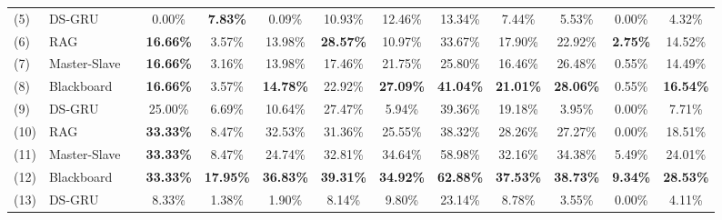 \begin{table}
{\begin{tabular}{ll c cccccc c c c c}
        \midrule
        \midrule
        
        (5) & {DS-GRU} &  & 0.00\% & \textbf{7.83\%} & 0.09\% & 10.93\% & 12.46\% & 13.34\% & 7.44\% & 5.53\% & 0.00\% & 4.32\% \\
        
        (6) & {RAG} & & \textbf{16.66\%} & 3.57\% & 13.98\% & \textbf{28.57\%} & 10.97\% & 33.67\% & 17.90\% & 22.92\% & \textbf{2.75\%} & 14.52\% \\
        
        (7) & {Master-Slave} & & \textbf{16.66\%} & 3.16\% & 13.98\% & 17.46\% & 21.75\% & 25.80\% & 16.46\% & 26.48\% & 0.55\% & 14.49\% \\
        
         
        
        (8) & {Blackboard} & & \textbf{16.66\%} & 3.57\% & \textbf{14.78\%} & 22.92\% & \textbf{27.09\%} & \textbf{41.04\%} & \textbf{21.01\%} & \textbf{28.06\%} & 0.55\% & \textbf{16.54\%} \\
        
        \midrule
        \midrule
        
        (9) & {DS-GRU} &  & 25.00\% & 6.69\% & 10.64\% & 27.47\% & 5.94\% & 39.36\% & 19.18\% & 3.95\% & 0.00\% & 7.71\% \\
        
        (10) & {RAG} & & \textbf{33.33\%} & 8.47\% & 32.53\% & 31.36\% & 25.55\% & 38.32\% & 28.26\% & 27.27\% & 0.00\% & 18.51\% \\
        
        (11) & {Master-Slave} & & \textbf{33.33\%} & 8.47\% & 24.74\% & 32.81\% & 34.64\% & 58.98\% & 32.16\% & 34.38\% & 5.49\% & 24.01\% \\
        
         
        
        (12) & {Blackboard} & & \textbf{33.33\%} & \textbf{17.95\%} & \textbf{36.83\%} & \textbf{39.31\%} & \textbf{34.92\%} & \textbf{62.88\%} & \textbf{37.53\%} & \textbf{38.73\%} & \textbf{9.34\%} & \textbf{28.53\%} \\
        
        \midrule
        \midrule
        
        (13) & {DS-GRU} &  & 8.33\% & 1.38\% & 1.90\% & 8.14\% & 9.80\% & 23.14\% & 8.78\% & 3.55\% & 0.00\% & 4.11\% \\
        

\end{tabular}}
\end{table}
